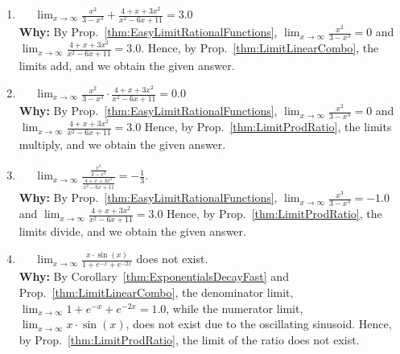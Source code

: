 \begin{enumerate}
\renewcommand{\labelenumi}{(\alph{enumi})}
\setlength{\itemsep}{.2cm}

\item  \Ans~~ $\displaystyle \lim_{x \to \infty} \frac{x^2}{3 - x^3} + \frac{4 + x + 3x^2}{x^2 -6x + 11} = 3.0$\\

\textbf{Why:} By Prop.~\ref{thm:EasyLimitRationalFunctions},  $\displaystyle \lim_{x \to \infty} \frac{x^2}{3 - x^3} = 0$ and  $\displaystyle \lim_{x \to \infty} \frac{4 + x + 3x^2}{x^2 -6x + 11} = 3.0$. Hence, by Prop.~\ref{thm:LimitLinearCombo}, the limits add, and we obtain the given answer.


\item  \Ans~~ $\displaystyle \lim_{x \to \infty} \frac{x^2}{3 - x^3} \cdot \frac{4 + x + 3x^2}{x^2 -6x + 11} = 0.0$\\


\textbf{Why:}  By Prop.~\ref{thm:EasyLimitRationalFunctions}, $\displaystyle \lim_{x \to \infty} \frac{x^2}{3 - x^3} = 0$ and $\displaystyle \lim_{x \to \infty} \frac{4 + x + 3x^2}{x^2 -6x + 11} = 3.0$ Hence, by Prop.~\ref{thm:LimitProdRatio}, the limits multiply, and we obtain the given answer.

\item  \Ans~~ $\displaystyle \lim_{x \to \infty} \frac{\frac{x^3}{3 - x^3}}{\frac{4 + x + 3x^2}{x^2 -6x + 11}} = -\frac{1}{3}$.\\

\textbf{Why:} By Prop.~\ref{thm:EasyLimitRationalFunctions}, $\displaystyle \lim_{x \to \infty} \frac{x^3}{3 - x^3} = -1.0$ and $\displaystyle \lim_{x \to \infty} \frac{4 + x + 3x^2}{x^2 -6x + 11} = 3.0$ Hence, by Prop.~\ref{thm:LimitProdRatio}, the limits divide, and we obtain the given answer.
    
\item  \Ans~~ $\displaystyle \lim_{x \to \infty} \frac{x \cdot \sin(x)}{1 + e^{-x} + e^{-2x}}$ does not exist. \\

\textbf{Why:} By Corollary~\ref{thm:ExponentialsDecayFast} and Prop.~\ref{thm:LimitLinearCombo}, the denominator limit, $\displaystyle \lim_{x \to \infty} 1 + e^{-x} + e^{-2x} = 1.0$, while the numerator limit, $\displaystyle \lim_{x \to \infty} x \cdot \sin(x)$, does not exist due to the oscillating sinusoid. Hence, by Prop.~\ref{thm:LimitProdRatio}, the limit of the ratio does not exist.

\end{enumerate} 

